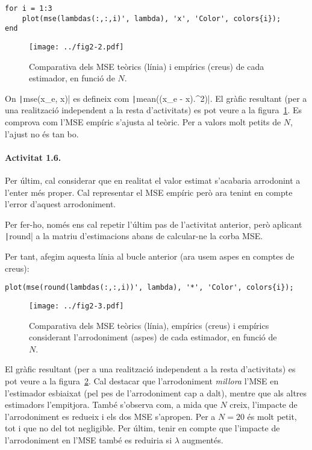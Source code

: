 \documentclass[catalan]{scrartcl}
\begin{document}
\begin{verbatim}
for i = 1:3
    plot(mse(lambdas(:,:,i)', lambda), 'x', 'Color', colors{i});
end
\end{verbatim}

\begin{figure}
\center
\texttt{[image: ../fig2-2.pdf]}
\caption{Comparativa dels MSE teòrics (línia) i empírics (creus) de cada estimador, en funció de $N$. \label{fig:fig2-2}}
\end{figure}

On \texttt|mse(x_e, x)| es defineix com \texttt|mean((x_e - x).^2)|.
El gràfic resultant (per a una realització independent a la resta d'activitats) es pot veure
a la figura~\ref{fig:fig2-2}. Es comprova com l'MSE empíric s'ajusta al teòric. Per a valors
molt petits de $N$, l'ajust no és tan bo.

\paragraph{Activitat 1.6.}

Per últim, cal considerar que en realitat el valor estimat s'acabaria arrodonint
a l'enter més proper. Cal representar el MSE empíric però ara tenint en compte l'error
d'aquest arrodoniment.

Per fer-ho, només ens cal repetir l'últim pas de l'activitat anterior, però aplicant
\texttt|round| a la matriu d'estimacions abans de calcular-ne la corba MSE.

Per tant, afegim aquesta línia al bucle anterior (ara usem
aspes en comptes de creus):

\begin{verbatim}
plot(mse(round(lambdas(:,:,i))', lambda), '*', 'Color', colors{i});
\end{verbatim}

\begin{figure}
\center
\texttt{[image: ../fig2-3.pdf]}
\caption{Comparativa dels MSE teòrics (línia), empírics (creus) i empírics
considerant l'arrodoniment (aspes) de cada estimador, en funció de $N$. \label{fig:fig2-3}}
\end{figure}

El gràfic resultant (per a una realització independent a la resta d'activitats) es pot veure
a la figura~\ref{fig:fig2-3}.
Cal destacar que l'arrodoniment \emph{millora} l'MSE en l'estimador esbiaixat (pel pes de
l'arrodoniment cap a dalt),
mentre que als altres estimadors l'empitjora. També s'observa com, a mida que $N$ creix,
l'impacte de l'arrodoniment es redueix i els dos MSE s'apropen. Per a $N = 20$ és molt petit,
tot i que no del tot negligible. Per últim, tenir en compte que l'impacte de l'arrodoniment
en l'MSE també es reduiria si $\lambda$ augmentés.
\end{document}
